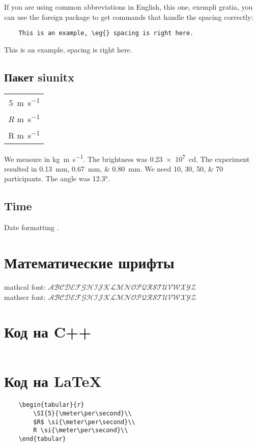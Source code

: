 If you are using common abbreviations in English, \eg{} this one, \ie{} exempli gratia, you can use the foreign package to get commands that handle the spacing correctly:

\begin{verbatim}
    This is an example, \eg{} spacing is right here.
\end{verbatim}
This is an example, \eg{} spacing is right here.




\subsection{Пакет siunitx}
\begin{tabular}{r}
    \SI{5}{\meter\per\second}\\
    $R$ \si{\meter\per\second}\\
    R \si{\meter\per\second}\\
\end{tabular}

We measure in \si{\kilogram\metre\per\second}.
The brightness was \SI{.23e7}{\candela}.
The experiment resulted in \SIlist{0.13;0.67;0.80}{\milli\metre}.
We need \numlist{10;30;50;70} participants.
The angle was \ang{12.3}.

\subsection{Time}
Date formatting .



\section{Математические шрифты}

mathcal font: $\mathcal{ABCDEFGHIJKLMNOPQRSTUVWXYZ}$\\
mathscr font: $\mathscr{ABCDEFGHIJKLMNOPQRSTUVWXYZ}$

\section{Код на C++}
\inputminted{c++}{assets/cpp_example.cpp}

\section{Код на \LaTeX}
\begin{verbatim}
    \begin{tabular}{r}
        \SI{5}{\meter\per\second}\\
        $R$ \si{\meter\per\second}\\
        R \si{\meter\per\second}\\
    \end{tabular}
\end{verbatim}

